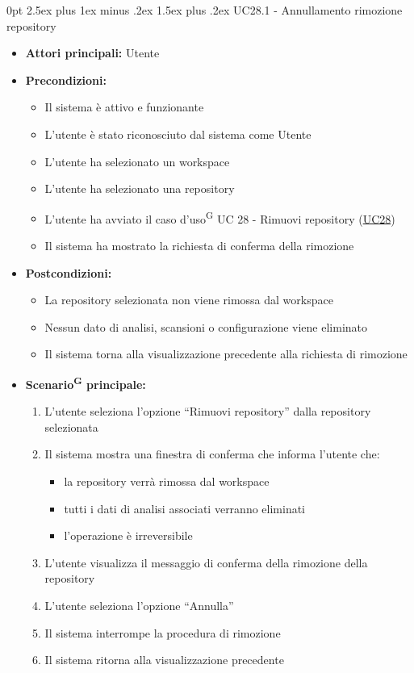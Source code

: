 \documentclass[a4paper, 11pt]{article}
\makeatletter
\renewcommand\paragraph{\@startsection{paragraph}{4}
  {0pt}
  {2.5ex plus 1ex minus .2ex}
  {1.5ex plus .2ex}
  {\normalfont\normalsize\bfseries\color{AccentDark}}}
\makeatother
\begin{document}
\paragraph{UC28.1 - Annullamento rimozione repository} \label{UC28.1}
\begin{itemize}
	\item \textbf{Attori principali:} Utente
	\item \textbf{Precondizioni:} 
	\begin{itemize}
		\item Il sistema è attivo e funzionante
		\item L'utente è stato riconosciuto dal sistema come Utente
		\item L'utente ha selezionato un workspace
		\item L'utente ha selezionato una repository
		\item L'utente ha avviato il caso d'uso\textsuperscript{G} UC 28 - Rimuovi repository (\hyperref[UC28]{UC28})
		\item Il sistema ha mostrato la richiesta di conferma della rimozione
	\end{itemize}
	\item \textbf{Postcondizioni:} 
	\begin{itemize}
		\item La repository selezionata non viene rimossa dal workspace
		\item Nessun dato di analisi, scansioni o configurazione viene eliminato
		\item Il sistema torna alla visualizzazione precedente alla richiesta di rimozione
	\end{itemize}
	\item \textbf{Scenario\textsuperscript{G} principale:}
	\begin{enumerate}
		\item L'utente seleziona l'opzione “Rimuovi repository” dalla repository selezionata
		\item Il sistema mostra una finestra di conferma che informa l'utente che:
		\begin{itemize}
			\item la repository verrà rimossa dal workspace
			\item tutti i dati di analisi associati verranno eliminati
			\item l'operazione è irreversibile
		\end{itemize}
		\item L'utente visualizza il messaggio di conferma della rimozione della repository
		\item L'utente seleziona l'opzione “Annulla”
		\item Il sistema interrompe la procedura di rimozione
		\item Il sistema ritorna alla visualizzazione precedente
	\end{enumerate}
\end{itemize}
\end{document}
